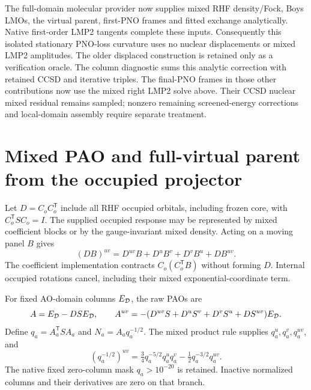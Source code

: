 \documentclass[11pt]{article}
\begin{document}
The full-domain molecular provider now supplies mixed RHF density/Fock,
Boys LMOs, the virtual parent, first-PNO frames and fitted exchange
analytically. Native first-order LMP2 tangents complete these inputs.
Consequently this isolated stationary PNO-loss curvature uses no nuclear
displacements or mixed LMP2 amplitudes. The older displaced construction
is retained only as a verification oracle. The column diagnostic sums
this analytic correction with retained CCSD and iterative triples.
The final-PNO frames in those other contributions now use the mixed right
LMP2 solve above. Their CCSD nuclear mixed residual remains sampled;
nonzero remaining screened-energy corrections and local-domain assembly
require separate treatment.


\section{Mixed PAO and full-virtual parent from the occupied projector}
Let $D=C_o C_o^{\mathsf T}$ include all RHF occupied orbitals, including
frozen core, with $C_o^{\mathsf T}S C_o=I$. The supplied occupied response
may be represented by mixed coefficient blocks or by the gauge-invariant
mixed density. Acting on a moving panel $B$ gives
\begin{equation}
 (DB)^{uv}=D^{uv}B+D^u B^v+D^v B^u+D B^{uv}.
\end{equation}
The coefficient implementation contracts $C_o(C_o^{\mathsf T}B)$ without
forming $D$. Internal occupied rotations cancel, including their mixed
exponential-coordinate term.

For fixed AO-domain columns $E_{\cal D}$, the raw PAOs are
\begin{equation}
 A=E_{\cal D}-D S E_{\cal D},\qquad
 A^{uv}=-(D^{uv}S+D^uS^v+D^vS^u+DS^{uv})E_{\cal D}.
\end{equation}
Define $q_a=A_a^{\mathsf T} S A_a$ and $N_a=A_a q_a^{-1/2}$.
The mixed product rule supplies $q_a^u,q_a^v,q_a^{uv}$, and
\begin{equation}
 (q_a^{-1/2})^{uv}
 =\tfrac34 q_a^{-5/2}q_a^u q_a^v-\tfrac12 q_a^{-3/2}q_a^{uv}.
\end{equation}
The native fixed zero-column mask $q_a>10^{-20}$ is retained. Inactive
normalized columns and their derivatives are zero on that branch.
\end{document}
